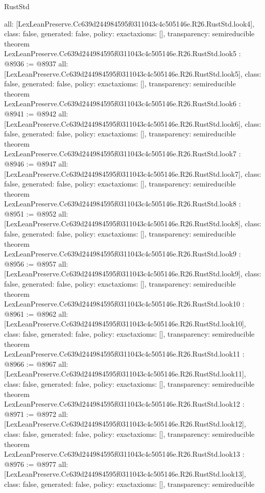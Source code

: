 \begin{lexlean}{RustStd}
\begin{coremodule}
{  all: [LexLeanPreserve.Cc639d244984595f0311043c4c505146e.R26.RustStd.look4],
  class: false,
  generated: false,
  policy: exact{axioms: []},
  transparency: semireducible
}
theorem LexLeanPreserve.Cc639d244984595f0311043c4c505146e.R26.RustStd.look5 : @8936 := @8937 {
  all: [LexLeanPreserve.Cc639d244984595f0311043c4c505146e.R26.RustStd.look5],
  class: false,
  generated: false,
  policy: exact{axioms: []},
  transparency: semireducible
}
theorem LexLeanPreserve.Cc639d244984595f0311043c4c505146e.R26.RustStd.look6 : @8941 := @8942 {
  all: [LexLeanPreserve.Cc639d244984595f0311043c4c505146e.R26.RustStd.look6],
  class: false,
  generated: false,
  policy: exact{axioms: []},
  transparency: semireducible
}
theorem LexLeanPreserve.Cc639d244984595f0311043c4c505146e.R26.RustStd.look7 : @8946 := @8947 {
  all: [LexLeanPreserve.Cc639d244984595f0311043c4c505146e.R26.RustStd.look7],
  class: false,
  generated: false,
  policy: exact{axioms: []},
  transparency: semireducible
}
theorem LexLeanPreserve.Cc639d244984595f0311043c4c505146e.R26.RustStd.look8 : @8951 := @8952 {
  all: [LexLeanPreserve.Cc639d244984595f0311043c4c505146e.R26.RustStd.look8],
  class: false,
  generated: false,
  policy: exact{axioms: []},
  transparency: semireducible
}
theorem LexLeanPreserve.Cc639d244984595f0311043c4c505146e.R26.RustStd.look9 : @8956 := @8957 {
  all: [LexLeanPreserve.Cc639d244984595f0311043c4c505146e.R26.RustStd.look9],
  class: false,
  generated: false,
  policy: exact{axioms: []},
  transparency: semireducible
}
theorem LexLeanPreserve.Cc639d244984595f0311043c4c505146e.R26.RustStd.look10 : @8961 := @8962 {
  all: [LexLeanPreserve.Cc639d244984595f0311043c4c505146e.R26.RustStd.look10],
  class: false,
  generated: false,
  policy: exact{axioms: []},
  transparency: semireducible
}
theorem LexLeanPreserve.Cc639d244984595f0311043c4c505146e.R26.RustStd.look11 : @8966 := @8967 {
  all: [LexLeanPreserve.Cc639d244984595f0311043c4c505146e.R26.RustStd.look11],
  class: false,
  generated: false,
  policy: exact{axioms: []},
  transparency: semireducible
}
theorem LexLeanPreserve.Cc639d244984595f0311043c4c505146e.R26.RustStd.look12 : @8971 := @8972 {
  all: [LexLeanPreserve.Cc639d244984595f0311043c4c505146e.R26.RustStd.look12],
  class: false,
  generated: false,
  policy: exact{axioms: []},
  transparency: semireducible
}
theorem LexLeanPreserve.Cc639d244984595f0311043c4c505146e.R26.RustStd.look13 : @8976 := @8977 {
  all: [LexLeanPreserve.Cc639d244984595f0311043c4c505146e.R26.RustStd.look13],
  class: false,
  generated: false,
  policy: exact{axioms: []},
  transparency: semireducible
}
\end{coremodule}
\end{lexlean}
